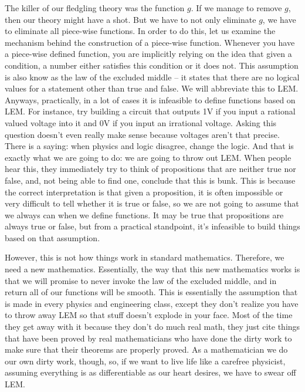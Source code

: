 \documentclass[]{book}
\begin{document}
The killer of our fledgling theory was the function $g$. If we manage to remove $g$, then our theory might have a shot. But we have to not only eliminate $g$, we have to eliminate all piece-wise functions. In order to do this, let us examine the mechanism behind the construction of a piece-wise function. Whenever you have a piece-wise defined function, you are implicitly relying on the idea that given a condition, a number either satisfies this condition or it does not. This assumption is also know as the law of the excluded middle -- it states that there are no logical values for a statement other than true and false. We will abbreviate this to LEM. Anyways, practically, in a lot of cases it is infeasible to define functions based on LEM. For instance, try building a circuit that outputs 1V if you input a rational valued voltage into it and 0V if you input an irrational voltage. Asking this question doesn't even really make sense because voltages aren't that precise. There is a saying: when physics and logic disagree, change the logic. And that is exactly what we are going to do: we are going to throw out LEM. When people hear this, they immediately try to think of propositions that are neither true nor false, and, not being able to find one, conclude that this is bunk. This is because the correct interpretation is that given a proposition, it is often impossible or very difficult to tell whether it is true or false, so we are not going to assume that we always can when we define functions. It may be true that propositions are always true or false, but from a practical standpoint, it's infeasible to build things based on that assumption.

However, this is not how things work in standard mathematics. Therefore, we need a new mathematics. Essentially, the way that this new mathematics works is that we will promise to never invoke the law of the excluded middle, and in return all of our functions will be smooth. This is essentially the assumption that is made in every physics and engineering class, except they don't realize you have to throw away LEM so that stuff doesn't explode in your face. Most of the time they get away with it because they don't do much real math, they just cite things that have been proved by real mathematicians who have done the dirty work to make sure that their theorems are properly proved. As a mathematician we do our own dirty work, though, so, if we want to live life like a carefree physicist, assuming everything is as differentiable as our heart desires, we have to swear off LEM.
\end{document}
